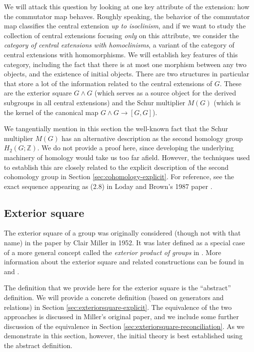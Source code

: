 We will attack this question by looking at one key attribute of the
extension: how the commutator map behaves. Roughly speaking, the
behavior of the commutator map classifies the central extension {\em
  up to isoclinism}, and if we want to study the collection of central
extensions focusing {\em only} on this attribute, we consider the {\em
  category of central extensions with homoclinisms}, a variant of the
category of central extensions with homomorphisms. We will establish
key features of this category, including the fact that there is at
most one morphism between any two objects, and the existence of
initial objects. There are two structures in particular that store a
lot of the information related to the central extensions of $G$. These
are the exterior square $G \wedge G$ (which serves as a source object
for the derived subgroups in all central extensions) and the Schur
multiplier $M(G)$ (which is the kernel of the canonical map $G \wedge
G \to [G,G]$).

We tangentially mention in this section the well-known fact that the
Schur multiplier $M(G)$ has an alternative description as the second
homology group $H_2(G;\mathbb{Z})$. We do not provide a proof here,
since developing the underlying machinery of homology would take us
too far afield. However, the techniques used to establish this are
closely related to the explicit description of the second cohomology
group in Section \ref{sec:cohomology-explicit}. For reference, see the
exact sequence appearing as (2.8) in Loday and Brown's 1987 paper
\cite{BrownLoday}.

\subsection{Exterior square}\label{sec:exteriorsquare}

The exterior square of a group was originally considered (though not
with that name) in the paper \cite{Miller52} by Clair Miller in
1952. It was later defined as a special case of a more general concept
called the {\em exterior product of groups} in \cite{BrownLoday}. More
information about the exterior square and related constructions can be
found in \cite{McDermottThesis} and \cite{Ellis87}.

The definition that we provide here for the exterior square is the
``abstract'' definition. We will provide a concrete definition (based
on generators and relations) in Section
\ref{sec:exteriorsquare-explicit}. The equivalence of the two
approaches is discussed in Miller's original paper, and we include
some further discussion of the equivalence in Section
\ref{sec:exteriorsquare-reconciliation}. As we demonstrate in this
section, however, the initial theory is best established using the
abstract definition.

